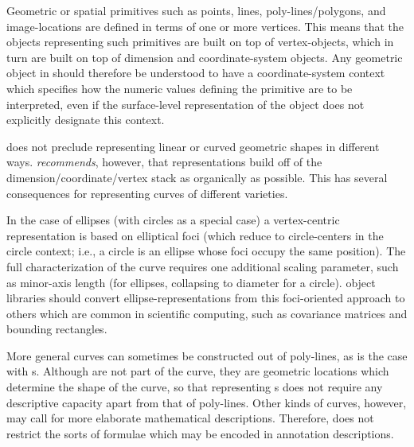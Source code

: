 {\begin{description}
Geometric or spatial primitives such as points, lines, 
poly-lines/polygons, and image-locations are  
defined in terms of one or more vertices.  
This means that the objects representing such 
primitives are built on top of vertex-objects, 
which in turn are built on top of dimension 
and coordinate-system objects.  Any geometric 
object in \AXFI{} should therefore be understood 
to have a coordinate-system context which specifies 
how the numeric values defining the primitive 
are to be interpreted, even if the surface-level 
representation of the object does not explicitly 
designate this context. 

\item[Circles, Ellipses, and Curves]  
\label{ph:curves}
\lAXFI{} does not preclude representing linear or curved 
geometric shapes in different ways.  \lAXFI{} 
\textit{recommends}, however, that 
representations build off of the dimension/coordinate/vertex 
stack as organically as possible.  This has several 
consequences for representing curves of different 
varieties.  

In the case of ellipses (with circles as a special case) 
a vertex-centric representation is based on elliptical 
foci (which reduce to circle-centers in the circle 
context; i.e., a circle is an ellipse whose foci occupy 
the same position).  The full characterization of 
the curve requires one additional scaling parameter, 
such as minor-axis length (for ellipses, collapsing 
to diameter for a circle).  \lAXFI{} object libraries  
should convert ellipse-representations from 
this foci-oriented approach to others which are 
common in scientific computing, such as covariance matrices 
and bounding rectangles.  

More general curves can sometimes be constructed out 
of poly-lines, as is the case with 
\BSPLINE{}s.  Although \BSPLINE{}  
are not part of the curve, they are geometric 
locations which determine the shape of the curve, 
so that representing \BSPLINE{}s does not require 
any descriptive capacity apart from that of 
poly-lines.  Other kinds of curves, however, 
may call for more elaborate mathematical 
descriptions.  Therefore, \AXFI{} does not 
restrict the sorts of formulae which may be 
encoded in annotation descriptions.


\end{description}}
